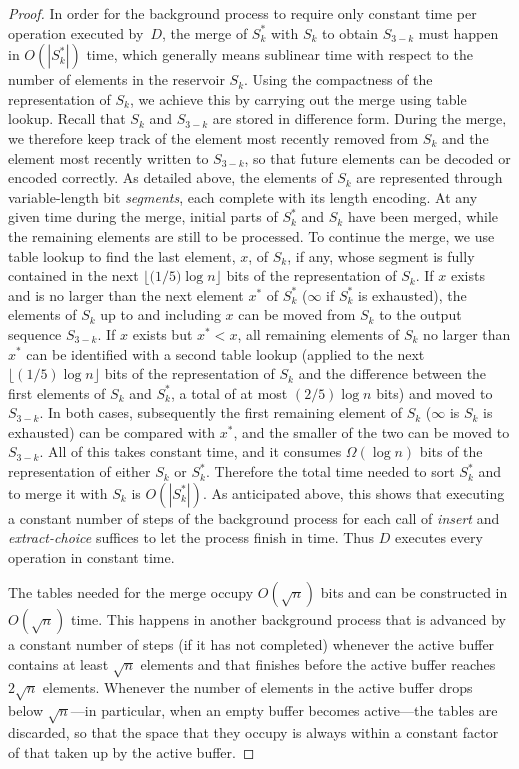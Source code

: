 \documentclass[envcountsame,envcountsect,undated,nolinenumbers]{lnthi}
\def\Tvn#1{\hbox{\textit{#1\/}}}
\def\Tfloor#1{\lfloor #1\rfloor}
\begin{document}
\begin{proof}
In order for the background process to require only
constant time per operation executed by~$D$,
the merge of $S_k^*$ with $S_k$ to obtain
$S_{3-k}$ must happen in $O(|S_k^*|)$ time, which
generally means sublinear time with
respect to the number of elements in the reservoir $S_k$.
Using the compactness of the representation
of $S_k$, we achieve this by carrying out the merge using table lookup.
Recall that $S_k$ and $S_{3-k}$ are stored in
difference form.
During the merge, we therefore
keep track of
the element most recently removed from $S_k$ and the 
element most recently written to $S_{3-k}$,
so that future elements can be decoded or
encoded correctly.
As detailed above,
the elements of $S_k$ are represented through
variable-length bit \emph{segments}, each
complete with its length encoding.
At any given time during the merge, initial parts of
$S_k^*$ and $S_k$ have been merged, while
the remaining elements are still to be processed.
To continue the merge, we use table lookup to
find the last element, $x$, of $S_k$, if any, whose segment
is fully contained in the next $\Tfloor{({1/5)}\log n}$
bits of the representation of $S_k$.
If $x$ exists and is no larger than the next
element $x^*$ of $S_k^*$
($\infty$ if $S_k^*$ is exhausted), the elements of $S_k$
up to and including $x$ can be moved from $S_k$
to the output sequence $S_{3-k}$.
If $x$ exists but $x^*<x$, all remaining elements of $S_k$
no larger than $x^*$ can be identified
with a second table lookup
(applied to the next $\Tfloor{({1/5})\log n}$ bits of
the representation of $S_k$
and the difference between the first elements
of $S_k$ and $S_k^*$, a total of at most
$({2/5})\log n$ bits)
and moved to $S_{3-k}$.
In both cases, subsequently
the first remaining element of $S_k$
($\infty$ is $S_k$ is exhausted) can be
compared with $x^*$, and the smaller of the two
can be moved to $S_{3-k}$.
All of this takes constant time, and it consumes
$\Omega(\log n)$ bits of the
representation of either $S_k$ or $S_k^*$.
Therefore the total time needed to sort
$S^*_k$ and to merge it with $S_k$ is $O(|S^*_k|)$.
As anticipated above, this shows that executing
a constant number of steps of the
background process for each call of
\Tvn{insert} and \Tvn{extract-choice}
suffices to let the process finish in time.
Thus $D$ executes every operation in
constant time.

The tables needed for the merge occupy
$O(\sqrt{n})$ bits and can be constructed in
$O(\sqrt{n})$ time.
This happens
in another background process that is
advanced by a constant number of steps
(if it has not completed) whenever
the active buffer contains at least
$\sqrt{n}$ elements and that finishes before
the active buffer reaches $2\sqrt{n}$ elements.
Whenever the number of elements in the
active buffer drops below $\sqrt{n}$---in particular,
when an empty buffer becomes active---the tables
are discarded, so that the
space that they occupy is always within a
constant factor of that taken up by the active buffer.


\end{proof}
\end{document}
